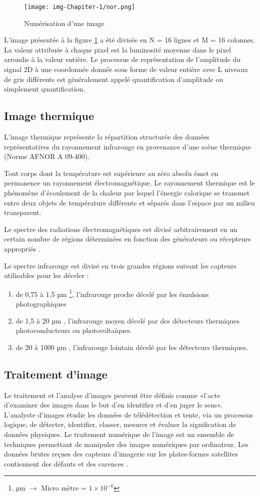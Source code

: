 \documentclass[12pt]{article}
\begin{document}
\begin{figure}[h]
\centering
\texttt{[image: img-Chapiter-1/nor.png]}
\caption{Numérisation d'une image}
\label{fig:imagenum}
\end{figure}

L'image présentée à la figure \ref{fig:imagenum} a été divisée en N = 16 lignes et M = 16 colonnes. La valeur attribuée à chaque pixel est la luminosité moyenne dans le pixel arrondis à la valeur entière. Le processus de représentation de l'amplitude du signal 2D à une coordonnée donnée sous forme de valeur entière avec L niveaux de gris différents est généralement appelé quantification d'amplitude ou simplement quantification.
\subsection{Image thermique}
L'image thermique représente la répartition structurée des données représentatives du rayonnement infrarouge en provenance d'une scène thermique (Norme AFNOR A 09-400).

Tout corps dont la température est supérieure au zéro absolu émet en permanence un rayonnement électromagnétique. Le rayonnement thermique est le phénomène d'écoulement de la chaleur par lequel l'énergie calorique se transmet entre deux objets de température différente et séparés dans l'espace par un milieu transparent.

Le spectre des radiations électromagnétiques est divisé arbitrairement en un certain nombre de régions déterminées en fonction des générateurs ou récepteurs appropriés \cite{40}.

Le spectre infrarouge est divisé en trois grandes régions suivant les capteurs utilisables pour les déceler \cite{41}:
\begin{enumerate}
	\item de 0,75 à 1,5 µm \footnote{µm $\longrightarrow$ Micro mètre  = $1 \times 10^{-6}$}, l'infrarouge proche décelé par les émulsions photographiques
	\item de 1,5 à 20 µm , l'infrarouge moyen décelé par des détecteurs thermiques photoconducteurs ou photovoltaïques.
	\item de 20 à 1000 µm , l'infrarouge lointain décelé par les détecteurs thermiques.
\end{enumerate}

\subsection{Traitement d’image}
Le traitement et l'analyse d'images peuvent être définis comme «l'acte d'examiner des images dans le but d'en identifier et d'en juger le sens». L'analyste d'images étudie les données de télédétection et tente, via un processus logique, de détecter, identifier, classer, mesurer et évaluer la signification de données physiques. Le traitement numérique de l'image est un ensemble de techniques permettant de manipuler des images numériques par ordinateur. Les données brutes reçues des capteurs d’imagerie sur les plates-formes satellites contiennent des défauts et des carences \cite{14}.
\end{document}
